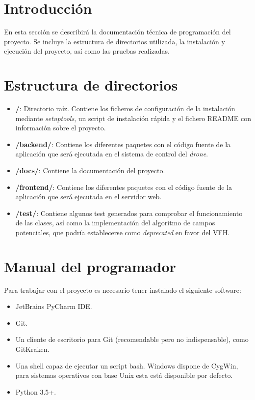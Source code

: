 \section{Introducción}

En esta sección se describirá la documentación técnica de programación del proyecto. Se incluye la estructura de directorios utilizada, la instalación y ejecución del proyecto, así como las pruebas realizadas.

\section{Estructura de directorios}
\begin{itemize}
\item \textbf{/}: Directorio raíz. Contiene los ficheros de configuración de la instalación mediante \emph{setuptools}, un script de instalación rápida y el fichero README con información sobre el proyecto.
\item \textbf{/backend/}: Contiene los diferentes paquetes con el código fuente de la aplicación que será ejecutada en el sistema de control del \emph{drone}.
\item \textbf{/docs/}: Contiene la documentación del proyecto.
\item \textbf{/frontend/}: Contiene los diferentes paquetes con el código fuente de la aplicación que será ejecutada en el servidor web.
\item \textbf{/test/}: Contiene algunos test generados para comprobar el funcionamiento de las clases, así como la implementación del algoritmo de campos potenciales, que podría establecerse como \emph{deprecated} en favor del VFH.
\end{itemize}


\section{Manual del programador}
Para trabajar con el proyecto es necesario tener instalado el siguiente software:

\begin{itemize}
\item JetBrains PyCharm IDE.
\item Git.
\item Un cliente de escritorio para Git (recomendable pero no indispensable), como GitKraken.
\item Una shell capaz de ejecutar un script bash. Windows dispone de CygWin, para sistemas operativos con base Unix esta está disponible por defecto. 
\item Python 3.5+.
\end{itemize}

